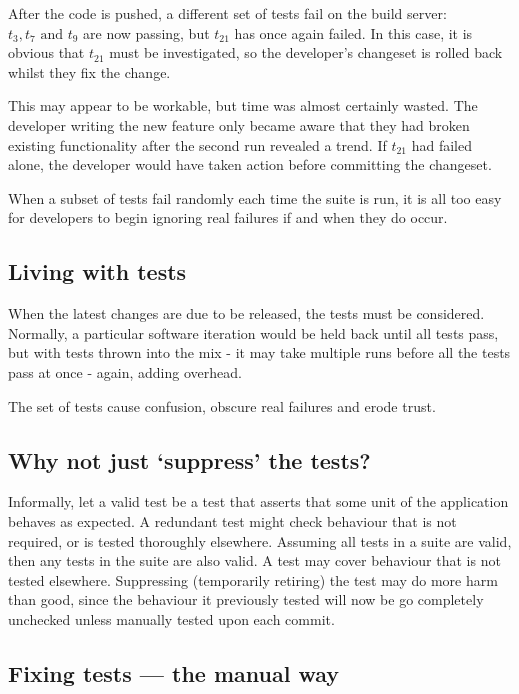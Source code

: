 After the code is pushed, a different set of tests fail on the build server: $t_{3}, t_{7} \text{ and } t_{9}$ are now passing, but $t_{21}$ has once again failed. In this case, it is obvious that $t_{21}$ must be investigated, so the developer’s changeset is rolled back whilst they fix the change.

This may appear to be workable, but time was almost certainly wasted. The developer writing the new feature only became aware that they had broken existing functionality after the second run revealed a trend. If $t_{21}$ had failed alone, the developer would have taken action before committing the changeset.

When a subset of tests fail randomly each time the suite is run, it is all too easy for developers to begin ignoring real failures if and when they do occur.


\subsection{Living with \flaky{} tests}

When the latest changes are due to be released, the \flaky{} tests must be considered. Normally, a particular software iteration would be held back until all tests pass, but with \flaky{} tests thrown into the mix - it may take multiple runs before all the tests pass at once - again, adding overhead.

The set of \flaky{} tests cause confusion, obscure real failures and erode trust.


\subsection{Why not just ‘suppress’ the \flaky{} tests?}

Informally, let a valid test be a test that asserts that some unit of the application behaves as expected. A redundant test might check behaviour that is not required, or is tested thoroughly elsewhere. Assuming all tests in a suite are valid, then any \flaky{} tests in the suite are also valid. A \flaky{} test may cover behaviour that is not tested elsewhere. Suppressing (temporarily retiring) the \flaky{} test may do more harm than good, since the behaviour it previously tested will now be go completely unchecked unless manually tested upon each commit.


\subsection{Fixing \flaky{} tests --- the manual way}

